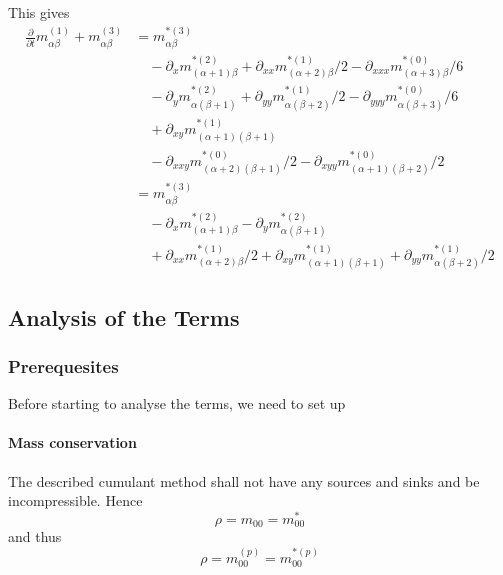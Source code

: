\documentclass{article}
\begin{document}
This gives
\begin{equation}
  \label{eq:third order in epsilon}
  \begin{aligned}
    \frac{\partial}{\partial t} m_{\alpha\beta}^{(1)} + m_{\alpha\beta}^{(3)}
    & =  m_{\alpha\beta}^{*(3)} \\
    &\quad - \partial_x m_{(\alpha+1)\beta}^{*(2)} + \partial_{xx} m_{(\alpha+2)\beta}^{*(1)}/2 - \partial_{xxx} m_{(\alpha+3)\beta}^{*(0)}/6 \\
    &\quad - \partial_y m_{\alpha(\beta+1)}^{*(2)} + \partial_{yy} m_{\alpha(\beta+2)}^{*(1)}/2 - \partial_{yyy} m_{\alpha(\beta+3)}^{*(0)}/6 \\
    &\quad + \partial_{xy} m_{(\alpha+1)(\beta+1)}^{*(1)} \\
    &\quad - \partial_{xxy} m_{(\alpha+2)(\beta+1)}^{*(0)}/2 - \partial_{xyy} m_{(\alpha+1)(\beta+2)}^{*(0)}/2 \\
    & =  m_{\alpha\beta}^{*(3)} \\
    &\quad - \partial_x m_{(\alpha+1)\beta}^{*(2)} - \partial_y m_{\alpha(\beta+1)}^{*(2)}  \\
    &\quad  + \partial_{xx} m_{(\alpha+2)\beta}^{*(1)}/2 + \partial_{xy} m_{(\alpha+1)(\beta+1)}^{*(1)} + \partial_{yy} m_{\alpha(\beta+2)}^{*(1)}/2
  \end{aligned}
\end{equation}

\subsection{Analysis of the Terms}
\label{sub:Analysis of the Terms}

\subsubsection{Prerequesites}
\label{subs:Prerequesites}
Before starting to analyse the terms, we need to set up
\paragraph{Mass conservation}
\label{par:Mass conservation}
The described cumulant method shall not have any sources and sinks and be incompressible. Hence
\begin{equation}
    \rho  = m_{00} = m_{00}^*
\end{equation}
and thus
\begin{equation}
    \rho = m_{00}^{(p)} = m_{00}^{*(p)}
\end{equation}
\end{document}
